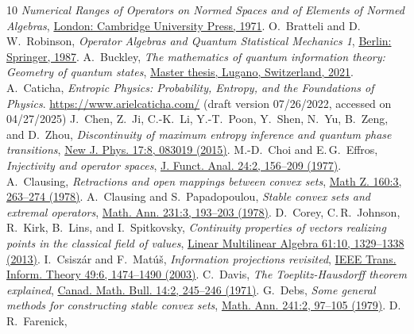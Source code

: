 \documentclass[a4paper,11pt,reqno]{amsart}
\theoremstyle{definition}
\theoremstyle{remark}
\numberwithin{equation}{section}
\begin{document}
\begin{thebibliography}{10}
\emph{Numerical Ranges of Operators on Normed Spaces and of Elements of Normed Algebras},
\href{https://doi.org/10.1017/CBO9781107359895}%
{London: Cambridge University Press, 1971}.
%
O.~Bratteli and D.\,W.~Robinson,
\emph{Operator Algebras and Quantum Statistical Mechanics 1},
\href{https://doi.org/10.1007/978-3-662-02520-8}%
{Berlin: Springer, 1987}. 
%
A.~Buckley,
\emph{The mathematics of quantum information theory: Geometry of quantum states},
\href{https://users.fmf.uni-lj.si/buckley/inf_master_thesis_inf_style_class%20(10).pdf}%
{Master thesis, Lugano, Switzerland, 2021}.
%
A.~Caticha, 
\emph{Entropic Physics: Probability, Entropy, and the Foundations of Physics}.
\href{https://www.arielcaticha.com/}{https://www.arielcaticha.com/}
(draft version 07/26/2022, accessed on 04/27/2025)
%
J.~Chen, Z.~Ji, C.-K.~Li, Y.-T.~Poon, Y.~Shen, N.~Yu, B.~Zeng, and D.~Zhou, 
\emph{Discontinuity of maximum entropy inference and quantum phase transitions},
\href{https://doi.org/10.1088/1367-2630/17/8/083019}%
{New J. Phys. 17:8, 083019 (2015)}.
%
M.-D.~Choi and E.\,G.~Effros,
\emph{Injectivity and operator spaces},
\href{https://doi.org/10.1016/0022-1236(77)90052-0}%
{J. Funct. Anal. 24:2, 156--209 (1977)}.
%
A.~Clausing, 
\emph{Retractions and open mappings between convex sets},
\href{https://doi.org/10.1007/BF01237040}%
{Math Z. 160:3, 263--274 (1978)}.
%
A.~Clausing and S.~Papadopoulou, 
\emph{Stable convex sets and extremal operators},
\href{https://doi.org/10.1007/BF01420240}%
{Math. Ann. 231:3, 193--203 (1978)}.
%
D.~Corey, C.\,R.~Johnson, R.~Kirk, B.~Lins, and I.~Spitkovsky,
\emph{Continuity properties of vectors realizing points in the classical field of 
values},
\href{https://doi.org/10.1080/03081087.2012.736991}%
{Linear Multilinear Algebra 61:10, 1329--1338 (2013)}.
%
I.~Csisz\'{a}r and F.~Mat\'{u}\v{s}, 
\emph{Information projections revisited},
\href{https://doi.org/10.1109/TIT.2003.810633}%
{IEEE Trans. Inform. Theory 49:6, 1474--1490 (2003)}.
%
C.~Davis, 
\emph{The Toeplitz-Hausdorff theorem explained},
\href{https://doi.org/10.4153/CMB-1971-042-7}%
{Canad. Math. Bull. 14:2, 245--246 (1971)}.
%
G.~Debs, 
\emph{Some general methods for constructing stable convex sets},
\href{https://doi.org/10.1007/BF01351913}%
{Math. Ann. 241:2, 97--105 (1979)}.
%
D.\,R.~Farenick, 

\end{thebibliography}
\end{document}
